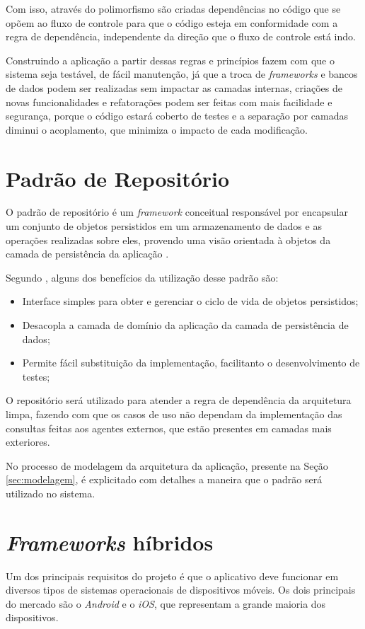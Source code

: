 Com isso, através do polimorfismo são criadas dependências no código que se opõem ao fluxo de controle para que o código esteja em conformidade com a regra de dependência, independente da direção que o fluxo de controle está indo.

Construindo a aplicação a partir dessas regras e princípios fazem com que o sistema seja testável, de fácil manutenção, já que a troca de \textit{frameworks} e bancos de dados podem ser realizadas sem impactar as camadas internas, criações de novas funcionalidades e refatorações podem ser feitas com mais facilidade e segurança, porque o código estará coberto de testes e a separação por camadas diminui o acoplamento, que minimiza o impacto de cada modificação.

\section{Padrão de Repositório}\label{sec:repositorypattern}

O padrão de repositório é um \textit{framework} conceitual responsável por encapsular um conjunto de objetos persistidos em um armazenamento de dados e as operações realizadas sobre eles, provendo uma visão orientada à objetos da camada de persistência da aplicação \cite{patterns}.

Segundo \textcite{ddd}, alguns dos benefícios da utilização desse padrão são:

\begin{itemize}
    \item Interface simples para obter e gerenciar o ciclo de vida de objetos persistidos;
    \item Desacopla a camada de domínio da aplicação da camada de persistência de dados;
    \item Permite fácil substituição da implementação, facilitanto o desenvolvimento de testes;
\end{itemize}

O repositório será utilizado para atender a regra de dependência da arquitetura limpa, fazendo com que os casos de uso não dependam da implementação das consultas feitas aos agentes externos, que estão presentes em camadas mais exteriores.

No processo de modelagem da arquitetura da aplicação, presente na Seção \ref{sec:modelagem}, é explicitado com detalhes a maneira que o padrão será utilizado no sistema.

\section{\textit{Frameworks} híbridos}\label{sec:flutter}
Um dos principais requisitos do projeto é que o aplicativo deve funcionar em diversos tipos de sistemas operacionais de dispositivos móveis. Os dois principais do mercado são o \textit{Android} e o \textit{iOS}, que representam a grande maioria dos dispositivos.


